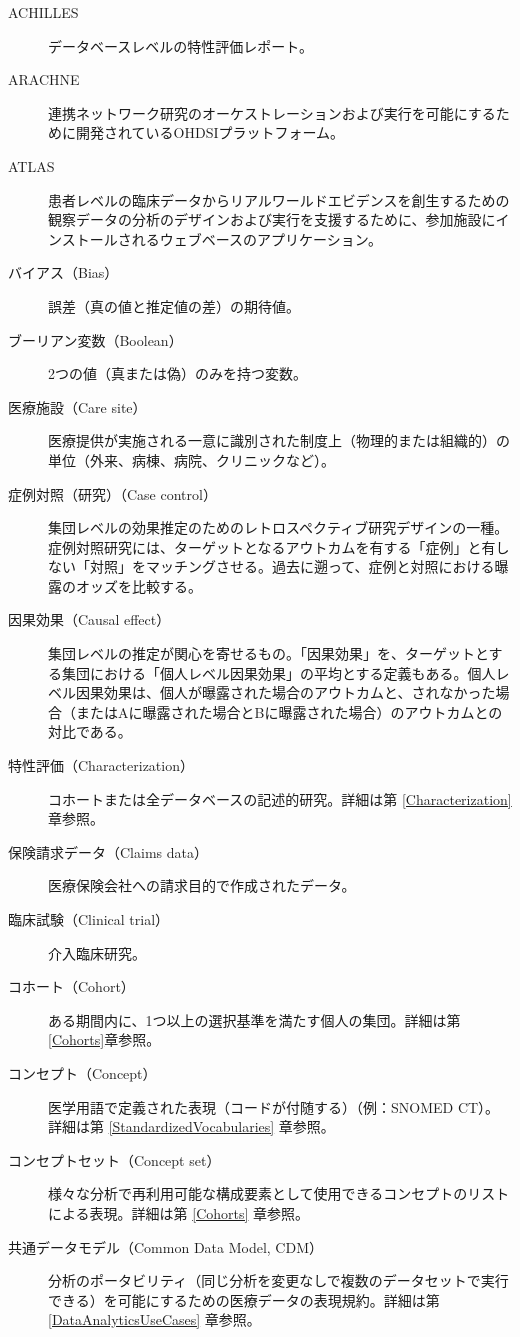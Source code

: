 \documentclass[
  11pt]{book}
\theoremstyle{definition}
\theoremstyle{definition}
\theoremstyle{definition}
\theoremstyle{definition}
\theoremstyle{remark}
\begin{document}
\begin{description}
\item[ACHILLES]
データベースレベルの特性評価レポート。
\item[ARACHNE]
連携ネットワーク研究のオーケストレーションおよび実行を可能にするために開発されているOHDSIプラットフォーム。
\item[ATLAS]
患者レベルの臨床データからリアルワールドエビデンスを創生するための観察データの分析のデザインおよび実行を支援するために、参加施設にインストールされるウェブベースのアプリケーション。
\item[バイアス（Bias）]
誤差（真の値と推定値の差）の期待値。
\item[ブーリアン変数（Boolean）]
2つの値（真または偽）のみを持つ変数。
\item[医療施設（Care site）]
医療提供が実施される一意に識別された制度上（物理的または組織的）の単位（外来、病棟、病院、クリニックなど）。
\item[症例対照（研究）（Case control）]
集団レベルの効果推定のためのレトロスペクティブ研究デザインの一種。症例対照研究には、ターゲットとなるアウトカムを有する「症例」と有しない「対照」をマッチングさせる。過去に遡って、症例と対照における曝露のオッズを比較する。
\item[因果効果（Causal effect）]
集団レベルの推定が関心を寄せるもの。「因果効果」を、ターゲットとする集団における「個人レベル因果効果」の平均とする定義もある。個人レベル因果効果は、個人が曝露された場合のアウトカムと、されなかった場合（またはAに曝露された場合とBに曝露された場合）のアウトカムとの対比である。
\item[特性評価（Characterization）]
コホートまたは全データベースの記述的研究。詳細は第 \ref{Characterization} 章参照。
\item[保険請求データ（Claims data）]
医療保険会社への請求目的で作成されたデータ。
\item[臨床試験（Clinical trial）]
介入臨床研究。
\item[コホート（Cohort）]
ある期間内に、1つ以上の選択基準を満たす個人の集団。詳細は第\ref{Cohorts}章参照。
\item[コンセプト（Concept）]
医学用語で定義された表現（コードが付随する）（例：SNOMED CT）。詳細は第 \ref{StandardizedVocabularies} 章参照。
\item[コンセプトセット（Concept set）]
様々な分析で再利用可能な構成要素として使用できるコンセプトのリストによる表現。詳細は第 \ref{Cohorts} 章参照。
\item[共通データモデル（Common Data Model, CDM）]
分析のポータビリティ（同じ分析を変更なしで複数のデータセットで実行できる）を可能にするための医療データの表現規約。詳細は第 \ref{DataAnalyticsUseCases} 章参照。

\end{description}
\end{document}
